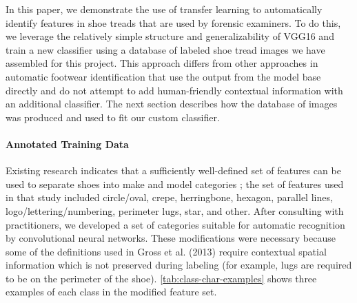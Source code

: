 \documentclass{article}\usepackage[]{graphicx}\usepackage[table]{xcolor}
\begin{document}
In this paper, we demonstrate the use of transfer learning to automatically identify features in shoe treads that are used by forensic examiners. To do this, we leverage the relatively simple structure and generalizability of VGG16 and train a new classifier using a database of labeled shoe tread images we have assembled for this project. This approach differs from other approaches \citep{kongCrossDomainForensicShoeprint2017,kongCrossDomainImageMatching2019a,zhangAdaptingConvolutionalNeural2017} in automatic footwear identification that use the output from the model base directly and do not attempt to add human-friendly contextual information with an additional classifier. The next section describes how the database of images was produced and used to fit our custom classifier.

\paragraph{Annotated Training Data}
Existing research indicates that a sufficiently well-defined set of features can be used to separate shoes into make and model categories \citep{grossVariabilitySignificanceClass2013}; the set of features used in that study included circle/oval, crepe, herringbone, hexagon, parallel lines, logo/lettering/numbering, perimeter lugs, star, and other. After consulting with practitioners, we developed a set of categories suitable for automatic recognition by convolutional neural networks. These modifications were necessary because some of the definitions used in Gross et al. (2013) require contextual spatial information which is not preserved during labeling (for example, lugs are required to be on the perimeter of the shoe). \autoref{tab:class-char-examples} shows three examples of each class in the modified feature set.
\end{document}
